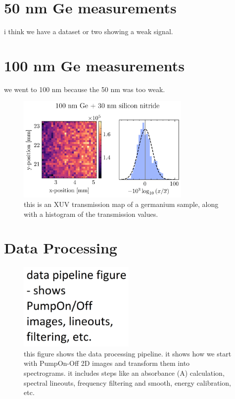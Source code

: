 \section{50 nm Ge measurements}
i think we have a dataset or two showing a weak signal.


\section{100 nm Ge measurements}
we went to 100 nm because the 50 nm was too weak.

\begin{figure}
	\centering
	\includegraphics[width=0.75\textwidth]{figures/chap3/Ge_map.png}
	\caption{this is an XUV transmission map of a germanium sample, along with a histogram of the transmission values.}
	\label{fig:Ge_map}
\end{figure}

\section{Data Processing}

\begin{figure}
	\centering
	\includegraphics[width=0.5\textwidth]{figures/chap3/Data_Pipeline.png}
	\caption{this figure shows the data processing pipeline. it shows how we start with PumpOn-Off 2D images and transform them into spectrograms. it includes steps like an absorbance (A) calculation, spectral lineouts, frequency filtering and smooth, energy calibration, etc.}
	\label{fig:Data_Pipeline}
\end{figure}

